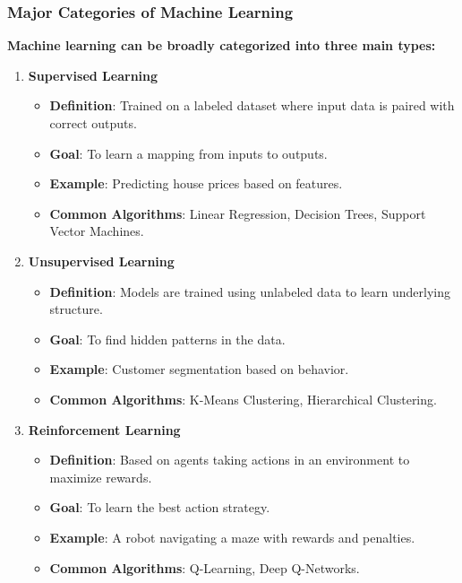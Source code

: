 \documentclass{beamer}
\begin{document}
\begin{frame}[fragile]
    \frametitle{Major Categories of Machine Learning}
    \textbf{Machine learning can be broadly categorized into three main types:}
    
    \begin{enumerate}
        \item \textbf{Supervised Learning}
        \begin{itemize}
            \item \textbf{Definition}: Trained on a labeled dataset where input data is paired with correct outputs.
            \item \textbf{Goal}: To learn a mapping from inputs to outputs.
            \item \textbf{Example}: Predicting house prices based on features.
            \item \textbf{Common Algorithms}: Linear Regression, Decision Trees, Support Vector Machines.
        \end{itemize}

        \item \textbf{Unsupervised Learning}
        \begin{itemize}
            \item \textbf{Definition}: Models are trained using unlabeled data to learn underlying structure.
            \item \textbf{Goal}: To find hidden patterns in the data.
            \item \textbf{Example}: Customer segmentation based on behavior.
            \item \textbf{Common Algorithms}: K-Means Clustering, Hierarchical Clustering.
        \end{itemize}

        \item \textbf{Reinforcement Learning}
        \begin{itemize}
            \item \textbf{Definition}: Based on agents taking actions in an environment to maximize rewards.
            \item \textbf{Goal}: To learn the best action strategy.
            \item \textbf{Example}: A robot navigating a maze with rewards and penalties.
            \item \textbf{Common Algorithms}: Q-Learning, Deep Q-Networks.
        \end{itemize}
    \end{enumerate}
\end{frame}
\end{document}
